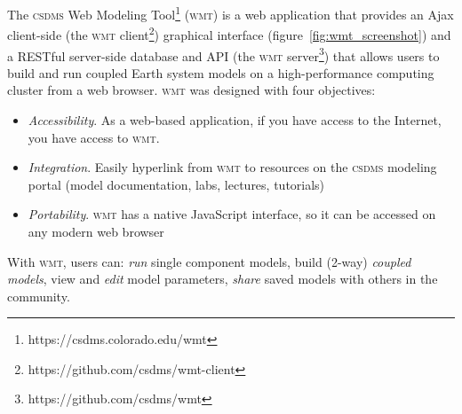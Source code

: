 \documentclass[11pt, oneside]{amsart}
\DeclareRobustCommand{\csdms}{\textsc{csdms}}
\DeclareRobustCommand{\wmt}{\textsc{wmt}}
\begin{document}
The \csdms{} Web Modeling Tool\footnote{https://csdms.colorado.edu/wmt}
(\wmt{}) is a web
application that provides an Ajax client-side (the \wmt{}
client\footnote{https://github.com/csdms/wmt-client}) graphical interface
(figure~\ref{fig:wmt_screenshot}) and a RESTful
server-side database and API (the \wmt{} server\footnote{https://github.com/csdms/wmt}) that allows users to build and run coupled Earth system models on
a high-performance computing cluster from a web browser. \wmt{} was designed
with four objectives:
\begin{itemize}

\item \emph{Accessibility}. As a web-based application, if you have access
      to the Internet, you have access to \wmt{}.

\item \emph{Integration}. Easily hyperlink from \wmt{} to resources on the 
      \csdms{} modeling portal (model documentation, labs, lectures,
      tutorials)

\item \emph{Portability}. \wmt{} has a native JavaScript interface, so it can
      be accessed on any modern web browser


\end{itemize}
With \wmt{}, users can: \emph{run} single component models, build (2-way)
\emph{coupled models}, view and \emph{edit} model parameters, \emph{share}
saved models with others in the community.

\end{document}
